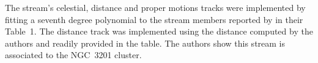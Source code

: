 The stream's celestial, distance and proper motions tracks were implemented by fitting a seventh degree polynomial to the stream members reported by \citet{Ibata2021} in their Table~1. The distance track was implemented using the distance computed by the authors and readily provided in the table. The authors show this stream is associated to the NGC~3201 cluster.
